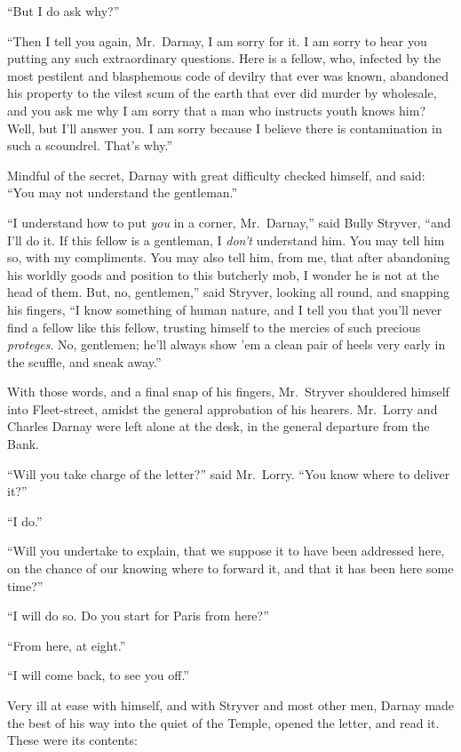 ``But I do ask why?''

``Then I tell you again, Mr.\ Darnay, I am sorry for it.  I am sorry to
hear you putting any such extraordinary questions.  Here is a fellow,
who, infected by the most pestilent and blasphemous code of devilry
that ever was known, abandoned his property to the vilest scum of the
earth that ever did murder by wholesale, and you ask me why I am
sorry that a man who instructs youth knows him?  Well, but I'll
answer you.  I am sorry because I believe there is contamination in
such a scoundrel.  That's why.''

Mindful of the secret, Darnay with great difficulty checked himself,
and said:  ``You may not understand the gentleman.''

``I understand how to put \emph{you} in a corner, Mr.\ Darnay,'' said Bully
Stryver, ``and I'll do it.  If this fellow is a gentleman, I \emph{don't}
understand him.  You may tell him so, with my compliments.  You may
also tell him, from me, that after abandoning his worldly goods and
position to this butcherly mob, I wonder he is not at the head of them.
But, no, gentlemen,'' said Stryver, looking all round, and snapping his
fingers, ``I know something of human nature, and I tell you that you'll
never find a fellow like this fellow, trusting himself to the mercies
of such precious \emph{proteges}.  No, gentlemen; he'll always show 'em
a clean pair of heels very early in the scuffle, and sneak away.''

With those words, and a final snap of his fingers, Mr.\ Stryver
shouldered himself into Fleet-street, amidst the general approbation
of his hearers.  Mr.\ Lorry and Charles Darnay were left alone at the
desk, in the general departure from the Bank.

``Will you take charge of the letter?'' said Mr.\ Lorry.  ``You know
where to deliver it?''

``I do.''

``Will you undertake to explain, that we suppose it to have been
addressed here, on the chance of our knowing where to forward it,
and that it has been here some time?''

``I will do so.  Do you start for Paris from here?''

``From here, at eight.''

``I will come back, to see you off.''

Very ill at ease with himself, and with Stryver and most other men,
Darnay made the best of his way into the quiet of the Temple,
opened the letter, and read it.  These were its contents:


